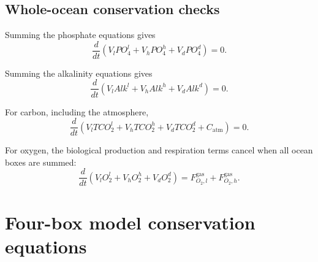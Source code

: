 \documentclass[11pt]{article}
\begin{document}
\subsection{Whole-ocean conservation checks}

Summing the phosphate equations gives
\begin{equation}
\frac{d}{dt}
\left(
V_lPO_4^l+V_hPO_4^h+V_dPO_4^d
\right)
=
0.
\label{eq:total_po4_conservation}
\end{equation}

Summing the alkalinity equations gives
\begin{equation}
\frac{d}{dt}
\left(
V_lAlk^l+V_hAlk^h+V_dAlk^d
\right)
=
0.
\label{eq:total_alk_conservation}
\end{equation}

For carbon, including the atmosphere,
\begin{equation}
\frac{d}{dt}
\left(
V_lTCO_2^l
+
V_hTCO_2^h
+
V_dTCO_2^d
+
C_{\mathrm{atm}}
\right)
=
0.
\label{eq:total_carbon_conservation}
\end{equation}

For oxygen, the biological production and respiration terms
cancel when all ocean boxes are summed:
\begin{equation}
\frac{d}{dt}
\left(
V_lO_2^l+V_hO_2^h+V_dO_2^d
\right)
=
F^{\mathrm{gas}}_{O_2,l}
+
F^{\mathrm{gas}}_{O_2,h}.
\label{eq:total_o2_balance}
\end{equation}

\newpage

%
%
%
%
%
%

\section{Four-box model conservation equations}
\end{document}
